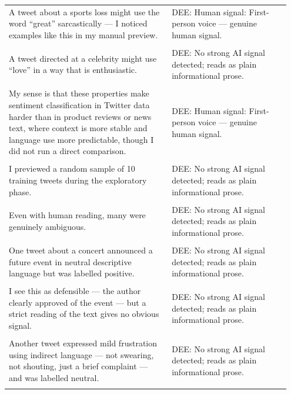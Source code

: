 \documentclass[11pt]{article}
\begin{document}
\begin{longtable}{|p{0.55\linewidth}|p{0.40\linewidth}|}
\hline
\rule{0pt}{3.5cm} & \\
\hline
A tweet about a sports loss might use the word ``great'' sarcastically --- I noticed examples like this in my manual preview. & DEE: Human signal: First-person voice --- genuine human signal. \\[2pt]
\hline
\rule{0pt}{3.5cm} & \\
\hline
A tweet directed at a celebrity might use ``love'' in a way that is enthusiastic. & DEE: No strong AI signal detected; reads as plain informational prose. \\[2pt]
\hline
\rule{0pt}{3.5cm} & \\
\hline
My sense is that these properties make sentiment classification in Twitter data harder than in product reviews or news text, where context is more stable and language use more predictable, though I did not run a direct comparison. & DEE: Human signal: First-person voice --- genuine human signal. \\[2pt]
\hline
\rule{0pt}{3.5cm} & \\
\hline
I previewed a random sample of 10 training tweets during the exploratory phase. & DEE: No strong AI signal detected; reads as plain informational prose. \\[2pt]
\hline
\rule{0pt}{3.5cm} & \\
\hline
Even with human reading, many were genuinely ambiguous. & DEE: No strong AI signal detected; reads as plain informational prose. \\[2pt]
\hline
\rule{0pt}{3.5cm} & \\
\hline
One tweet about a concert announced a future event in neutral descriptive language but was labelled positive. & DEE: No strong AI signal detected; reads as plain informational prose. \\[2pt]
\hline
\rule{0pt}{3.5cm} & \\
\hline
I see this as defensible --- the author clearly approved of the event --- but a strict reading of the text gives no obvious signal. & DEE: No strong AI signal detected; reads as plain informational prose. \\[2pt]
\hline
\rule{0pt}{3.5cm} & \\
\hline
Another tweet expressed mild frustration using indirect language --- not swearing, not shouting, just a brief complaint --- and was labelled neutral. & DEE: No strong AI signal detected; reads as plain informational prose. \\[2pt]
\hline
\rule{0pt}{3.5cm} & \\

\end{longtable}
\end{document}
